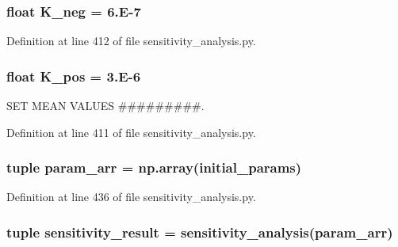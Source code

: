 \hypertarget{namespacesensitivity__analysis_a64d0c5854299798787675bc91586023c}{
\subsubsection[{K\-\_\-neg}]{\setlength{\rightskip}{0pt plus 5cm}float K\-\_\-neg = 6.\-E-\/7}}\label{namespacesensitivity__analysis_a64d0c5854299798787675bc91586023c}


Definition at line 412 of file sensitivity\-\_\-analysis.\-py.

\hypertarget{namespacesensitivity__analysis_ab1a8ebec490ba1301f818bd1c5f1f3fa}{
\subsubsection[{K\-\_\-pos}]{\setlength{\rightskip}{0pt plus 5cm}float K\-\_\-pos = 3.\-E-\/6}}\label{namespacesensitivity__analysis_ab1a8ebec490ba1301f818bd1c5f1f3fa}


S\-E\-T M\-E\-A\-N V\-A\-L\-U\-E\-S \#\#\#\#\#\#\#\#\#. 



Definition at line 411 of file sensitivity\-\_\-analysis.\-py.

\hypertarget{namespacesensitivity__analysis_a86a476e68e0e599be4ea6b1ccb088d46}{
\subsubsection[{param\-\_\-arr}]{\setlength{\rightskip}{0pt plus 5cm}tuple param\-\_\-arr = np.\-array({\bf initial\-\_\-params})}}\label{namespacesensitivity__analysis_a86a476e68e0e599be4ea6b1ccb088d46}


Definition at line 436 of file sensitivity\-\_\-analysis.\-py.

\hypertarget{namespacesensitivity__analysis_aa3b49cc44c40ee657d289412379593e5}{
\subsubsection[{sensitivity\-\_\-result}]{\setlength{\rightskip}{0pt plus 5cm}tuple sensitivity\-\_\-result = {\bf sensitivity\-\_\-analysis}({\bf param\-\_\-arr})}}\label{namespacesensitivity__analysis_aa3b49cc44c40ee657d289412379593e5}


